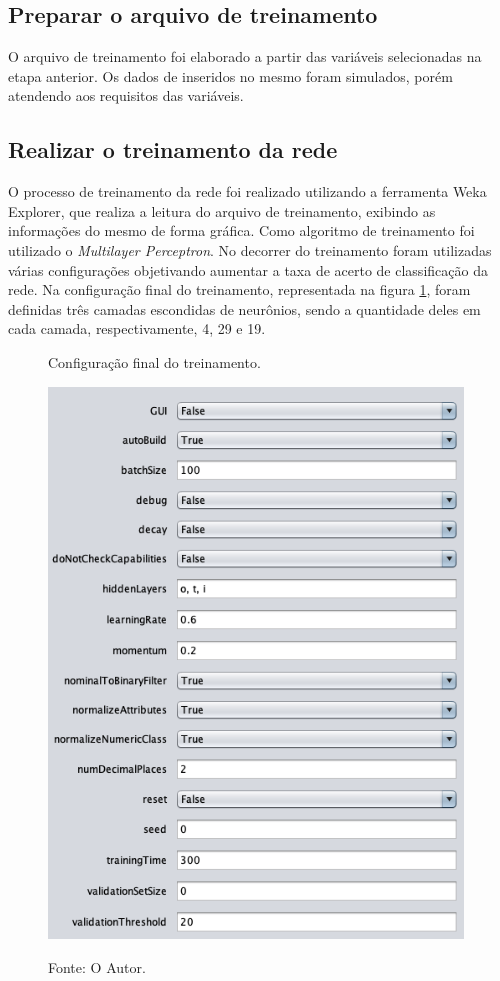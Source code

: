 \subsection{Preparar o arquivo de treinamento}

O arquivo de treinamento foi elaborado a partir das variáveis selecionadas na etapa anterior. Os dados de inseridos no mesmo foram simulados, porém atendendo aos requisitos das variáveis.

\subsection{Realizar o treinamento da rede}

O processo de treinamento da rede foi realizado utilizando a ferramenta Weka Explorer, que realiza a leitura do arquivo de treinamento, exibindo as informações do mesmo de forma gráfica. Como algoritmo de treinamento foi utilizado o \textit{Multilayer Perceptron}. No decorrer do treinamento foram utilizadas várias configurações objetivando aumentar a taxa de acerto de classificação da rede. Na configuração final do treinamento, representada na figura \ref{figura:treinamento}, foram definidas três camadas escondidas de neurônios, sendo a quantidade deles em cada camada, respectivamente, 4, 29 e 19.

\begin{figure}[H]
	\caption{Configuração final do treinamento.}
	\centering %
	\includegraphics[width=11cm]{resources/treinamento_weka.png} %
	\label{figura:treinamento}
	\captionsetup{singlelinecheck = false, format= hang, justification=raggedright, labelsep=space, width=11cm}
	\caption*{\footnotesize Fonte: O Autor.}
\end{figure}

